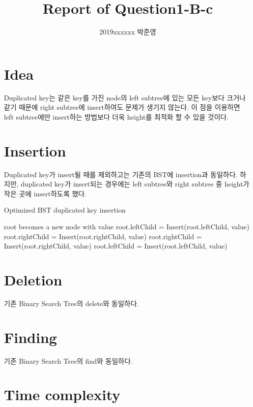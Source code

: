 \documentclass[a4paper, 11pt]{article}
\title{Report of Question1-B-c}
\author{2019xxxxxx 박준영}
\date{}
\begin{document}
\maketitle
\section{Idea}
Duplicated key는 같은 key를 가진 node의 left subtree에 있는 모든 key보다 크거나 같기 때문에 right subtree에 insert하여도 문제가 생기지 않는다. 이 점을 이용하면 left subtree에만 insert하는 방법보다 더욱 height를 최적화 할 수 있을 것이다.

\section{Insertion}
Duplicated key가 insert될 때를 제외하고는 기존의 BST에 insertion과 동일하다. 하지만, duplicated key가 insert되는 경우에는 left subtree와 right subtree 중 height가 작은 곳에 insert하도록 했다.
\\

\begin{algorithm}
	\caption{Optimized BST duplicated key insertion}
	\begin{algorithmic}
				\State root becomes a new node with value
				\State root.leftChild = Insert(root.leftChild, value)
				\State root.rightChild = Insert(root.rightChild, value)
			\Else
					\State root.rightChild = Insert(root.rightChild, value)
				\Else
					\State root.leftChild = Insert(root.leftChild, value)
				\EndIf
			\EndIf
			\State {}
		\EndFunction
	\end{algorithmic}
\end{algorithm}

\section{Deletion}
기존 Binary Search Tree의 delete와 동일하다.

\section{Finding}
기존 Binary Search Tree의 find와 동일하다.

\section{Time complexity}
\end{document}
